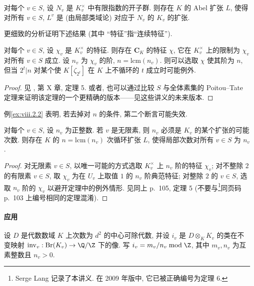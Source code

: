 \begin{theorem}\label{thm:viii.2.3}
对每个 $v\in S$, 设 $N_v$ 是 $K_v^{\times}$ 中有限指数的开子群. 则存在 $K$ 的 Abel 扩张 $L$, 使得对所有 $v\in S$, $L^{v}$ 是 (由局部类域论) 对应于 $N_v$ 的 $K_v$ 的扩张.
\end{theorem}

更细致的分析证明下述结果 (其中 ``特征''指``连续特征'').

\begin{theorem}\label{thm:viii.2.4}
对每个 $v\in S$, 设 $\chi_v$ 是 $K_v^{\times}$ 的特征. 则存在 $\mathbf{C}_K$ 的特征 $\chi$, 它在 $K_v^{\times}$ 上的限制为 $\chi_v$ 对所有 $v\in S$ 成立. 设 $n_v$ 为 $\chi_v$ 的阶, $n=\mathrm{lcm}(n_v)$. 则可以选取 $\chi$ 使其阶为 $n$, 但当 $2^{t}|n$ 对某个使 $K[\zeta_{2^{t}}]$ 在 $K$ 上不循环的 $t$ 成立时可能例外.
\end{theorem}

\begin{proof}
见 \cite{ArtinTate1961}, 第 X 章, 定理 5. 或者, 也可以通过比较 $S$ 与全体素集的 Poitou--Tate 定理来证明该定理的一个更精确的版本——见这些讲义的未来版本.
\end{proof}

例\ref{ex:viii.2.2} 表明, 若去掉对 $n$ 的条件, 第二个断言可能失效.

\begin{corollary}\label{cor:viii.2.5}
对每个 $v\in S$, 设 $n_v$ 为正整数. 若 $v$ 是无限素, 则 $n_v$ 必须是 $K_v$ 的某个扩张的可能次数. 则存在 $K$ 的 $n=\mathrm{lcm}(n_v)$ 次循环扩张 $L$, 使得局部次数对所有 $v\in S$ 为 $n_v$.
\end{corollary}

\begin{proof}
对无限素 $v\in S$, 以唯一可能的方式选取 $K_v^{\times}$ 上 $n_v$ 阶的特征 $\chi_v$; 对不整除 $2$ 的有限素 $v\in S$, 取 $\chi_v$ 为在 $U_v$ 上取值 $1$ 的 $n_v$ 阶典范特征; 对整除 $2$ 的 $v\in S$, 选取 $n_v$ 阶的 $\chi_v$ 以避开定理中的例外情形. 见同上 p.~105, 定理 5 (不要与\footnote{Serge Lang 记录了本讲义. 在 2009 年版中, 它已被正确编号为定理 6.}同页码 p.~103 上编号相同的定理混淆).
\end{proof}

\paragraph{应用}
设 $D$ 是代数数域 $K$ 上次数为 $d^{2}$ 的中心可除代数, 并设 $i_v$ 是 $D\otimes_K K_v$ 的类在不变映射 $\mathrm{inv}_v:\mathrm{Br}(K_v)\to\Q/\Z$ 下的像. 写 $i_v=m_v/n_v \bmod \Z$, 其中 $m_v,n_v$ 为互素整数且 $n_v>0$.

